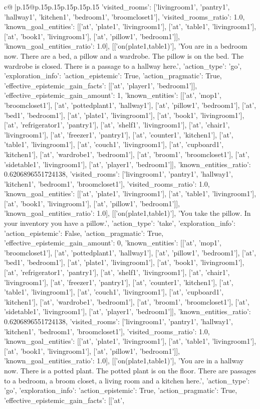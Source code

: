 \documentclass{article}
\begin{document}
{\begin{supertabular}{c@{$\;$}|p{.15\linewidth}@{}p{.15\linewidth}p{.15\linewidth}p{.15\linewidth}p{.15\linewidth}p{.15\linewidth}}
{{{'visited_rooms': ['livingroom1', 'pantry1', 'hallway1', 'kitchen1', 'bedroom1', 'broomcloset1'], 'visited_rooms_ratio': 1.0, 'known_goal_entities': [['at', 'plate1', 'livingroom1'], ['at', 'table1', 'livingroom1'], ['at', 'book1', 'livingroom1'], ['at', 'pillow1', 'bedroom1']], 'known_goal_entities_ratio': 1.0}}], [['on(plate1,table1)'], 'You are in a bedroom now. There are a bed, a pillow and a wardrobe. The pillow is on the bed. The wardrobe is closed. There is a passage to a hallway here.', {'action_type': 'go', 'exploration_info': {'action_epistemic': True, 'action_pragmatic': True, 'effective_epistemic_gain_facts': [['at', 'player1', 'bedroom1']], 'effective_epistemic_gain_amount': 1, 'known_entities': [['at', 'mop1', 'broomcloset1'], ['at', 'pottedplant1', 'hallway1'], ['at', 'pillow1', 'bedroom1'], ['at', 'bed1', 'bedroom1'], ['at', 'plate1', 'livingroom1'], ['at', 'book1', 'livingroom1'], ['at', 'refrigerator1', 'pantry1'], ['at', 'shelf1', 'livingroom1'], ['at', 'chair1', 'livingroom1'], ['at', 'freezer1', 'pantry1'], ['at', 'counter1', 'kitchen1'], ['at', 'table1', 'livingroom1'], ['at', 'couch1', 'livingroom1'], ['at', 'cupboard1', 'kitchen1'], ['at', 'wardrobe1', 'bedroom1'], ['at', 'broom1', 'broomcloset1'], ['at', 'sidetable1', 'livingroom1'], ['at', 'player1', 'bedroom1']], 'known_entities_ratio': 0.6206896551724138, 'visited_rooms': ['livingroom1', 'pantry1', 'hallway1', 'kitchen1', 'bedroom1', 'broomcloset1'], 'visited_rooms_ratio': 1.0, 'known_goal_entities': [['at', 'plate1', 'livingroom1'], ['at', 'table1', 'livingroom1'], ['at', 'book1', 'livingroom1'], ['at', 'pillow1', 'bedroom1']], 'known_goal_entities_ratio': 1.0}}], [['on(plate1,table1)'], 'You take the pillow. In your inventory you have a pillow.', {'action_type': 'take', 'exploration_info': {'action_epistemic': False, 'action_pragmatic': True, 'effective_epistemic_gain_amount': 0, 'known_entities': [['at', 'mop1', 'broomcloset1'], ['at', 'pottedplant1', 'hallway1'], ['at', 'pillow1', 'bedroom1'], ['at', 'bed1', 'bedroom1'], ['at', 'plate1', 'livingroom1'], ['at', 'book1', 'livingroom1'], ['at', 'refrigerator1', 'pantry1'], ['at', 'shelf1', 'livingroom1'], ['at', 'chair1', 'livingroom1'], ['at', 'freezer1', 'pantry1'], ['at', 'counter1', 'kitchen1'], ['at', 'table1', 'livingroom1'], ['at', 'couch1', 'livingroom1'], ['at', 'cupboard1', 'kitchen1'], ['at', 'wardrobe1', 'bedroom1'], ['at', 'broom1', 'broomcloset1'], ['at', 'sidetable1', 'livingroom1'], ['at', 'player1', 'bedroom1']], 'known_entities_ratio': 0.6206896551724138, 'visited_rooms': ['livingroom1', 'pantry1', 'hallway1', 'kitchen1', 'bedroom1', 'broomcloset1'], 'visited_rooms_ratio': 1.0, 'known_goal_entities': [['at', 'plate1', 'livingroom1'], ['at', 'table1', 'livingroom1'], ['at', 'book1', 'livingroom1'], ['at', 'pillow1', 'bedroom1']], 'known_goal_entities_ratio': 1.0}}], [['on(plate1,table1)'], 'You are in a hallway now. There is a potted plant. The potted plant is on the floor. There are passages to a bedroom, a broom closet, a living room and a kitchen here.', {'action_type': 'go', 'exploration_info': {'action_epistemic': True, 'action_pragmatic': True, 'effective_epistemic_gain_facts': [['at', }}}
\end{supertabular}}
\end{document}
